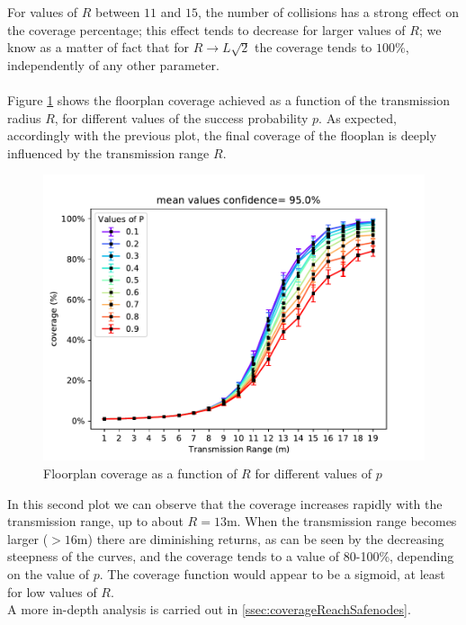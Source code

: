 \noindent
For values of $R$ between $11$ and $15$, the number of collisions has a strong
effect on the coverage percentage; this effect tends to decrease for larger
values of $R$; we know as a matter of fact that for $R \to L\sqrt{2}$ the
coverage tends to $100$\%, independently of any other parameter.\\
\\
Figure \ref{fig:coverageRP} shows the floorplan coverage achieved as a
function of the transmission radius $R$, for different values of the success probability $p$. As expected, accordingly with the previous plot, the
final coverage of the flooplan is deeply influenced by the transmission range $R$.
\begin{figure}[H]
    \begin{center}
        \includegraphics[scale=.75,trim={0 0 0 0.8cm},clip]{img/big_coverage_r_mean_95.0.pdf}
    \end{center}
    \vspace*{-0.5cm}
    \caption{Floorplan coverage as a function of $R$ for different values of $p$}
    \label{fig:coverageRP}
\end{figure}
\noindent
In this second plot we can observe that the coverage increases rapidly with the
transmission range, up to about $R=13$m. When the transmission range becomes
larger ($> 16$m) there are diminishing returns, as can be seen by the decreasing
steepness of the curves, and the coverage tends to a value of 80-100\%,
depending on the value of $p$. The coverage function would appear to be a
sigmoid, at least for low values of $R$.\\
A more in-depth analysis is carried out in \ref{ssec:coverageReachSafenodes}.
